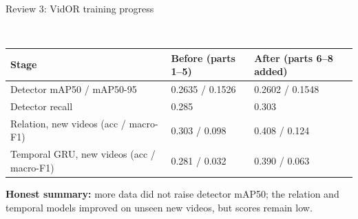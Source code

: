 \documentclass[aspectratio=169,11pt]{beamer}
\begin{document}
\begin{frame}{Review 3: VidOR training progress}
  \centering
  \begin{center}\vspace{0.2cm}
  \\[12pt]
  \footnotesize
  \begin{tabular}{@{}lll@{}}
    \toprule
    \textbf{Stage} & \textbf{Before (parts 1--5)} & \textbf{After (parts 6--8 added)}\\
    \midrule
    Detector mAP50 / mAP50-95 & 0.2635 / 0.1526 & 0.2602 / 0.1548\\
    Detector recall & 0.285 & 0.303\\
    Relation, new videos (acc / macro-F1) & 0.303 / 0.098 & 0.408 / 0.124\\
    Temporal GRU, new videos (acc / macro-F1) & 0.281 / 0.032 & 0.390 / 0.063\\
    \bottomrule
  \end{tabular}
  \end{center}
  {\small\bfseries\color{amber} Honest summary: }{\small more data did not raise detector mAP50; the relation and temporal models improved on unseen new videos, but scores remain low.}
\end{frame}
\end{document}

